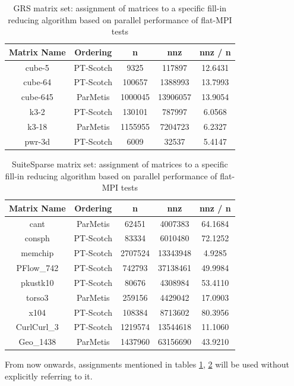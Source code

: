 \begin{table}[htpb]
\centering
\begin{tabular}{|c|c|c|c|c|}
\hline
Matrix Name & Ordering  & n       & nnz      & nnz / n \\ \hline
cube-5      & PT-Scotch & 9325    & 117897   & 12.6431 \\ \hline
cube-64     & PT-Scotch & 100657  & 1388993  & 13.7993 \\ \hline
cube-645    & ParMetis  & 1000045 & 13906057 & 13.9054 \\ \hline
k3-2        & PT-Scotch & 130101  & 787997   & 6.0568  \\ \hline
k3-18       & ParMetis  & 1155955 & 7204723  & 6.2327  \\ \hline
pwr-3d      & PT-Scotch & 6009    & 32537    & 5.4147  \\ \hline
\end{tabular}
\caption{GRS matrix set: assignment of matrices to a specific fill-in reducing algorithm based on parallel performance of flat-MPI tests}
\label{table:GRS-ordering-assignment}
\end{table}


\begin{table}[htpb]
\centering
\begin{tabular}{|c|c|c|c|c|}
\hline
Matrix Name & Ordering  & n       & nnz      & nnz / n \\ \hline
cant        & ParMetis  & 62451   & 4007383  & 64.1684 \\ \hline
consph      & PT-Scotch & 83334   & 6010480  & 72.1252 \\ \hline
memchip     & PT-Scotch & 2707524 & 13343948 & 4.9285  \\ \hline
PFlow\_742  & PT-Scotch & 742793  & 37138461 & 49.9984 \\ \hline
pkustk10    & PT-Scotch & 80676   & 4308984  & 53.4110 \\ \hline
torso3      & ParMetis  & 259156  & 4429042  & 17.0903 \\ \hline
x104        & PT-Scotch & 108384  & 8713602  & 80.3956 \\ \hline
CurlCurl\_3 & PT-Scotch & 1219574 & 13544618 & 11.1060 \\ \hline
Geo\_1438   & ParMetis  & 1437960 & 63156690 & 43.9210 \\ \hline
\end{tabular}
\caption{SuiteSparse matrix set: assignment of matrices to a specific fill-in reducing algorithm based on parallel performance of flat-MPI tests}
\label{table:SuiteSparse-ordering-assignment}
\end{table}


From now onwards, assignments mentioned in tables \ref{table:GRS-ordering-assignment}, \ref{table:SuiteSparse-ordering-assignment} will be used without explicitly referring to it.\\